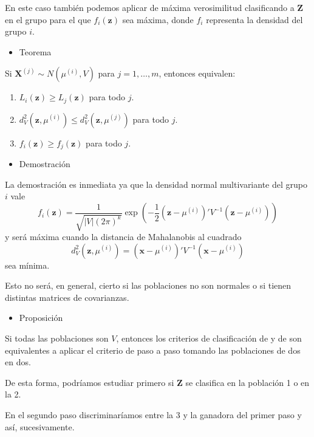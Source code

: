 En este caso también podemos aplicar de máxima verosimilitud clasificando a $\mathbf{Z}$ en el grupo para el que $f_i(\mathbf{z})$ sea máxima, donde $f_i$ representa la densidad del grupo $i$.

\begin{itemize}[label=\color{red}\textbullet, leftmargin=*]
	\item \color{lightblue}Teorema
\end{itemize}
Si $\mathbf{X}^{(j)}\sim N(\mu^{(i)},V)$ para $j=1,\dots,m$, entonces equivalen:
\begin{enumerate}[label=\color{lightblue}\arabic*)]
	\item $L_i(\mathbf{z})\ge L_j(\mathbf{z})$ para todo $j$.
\item $d_V^2(\mathbf{z},\mu^{(i)})\le d_V^2(\mathbf{z},\mu^{(j)})$ para todo $j$.
\item $f_i(\mathbf{z})\ge f_j(\mathbf{z})$ para todo $j$.
\end{enumerate}
\begin{itemize}[label=\color{red}\textbullet, leftmargin=*]
	\item \color{lightblue}Demostración
\end{itemize}
La demostración es inmediata ya que la densidad normal multivariante del grupo $i$ vale \[ f_i(\mathbf{z})=\dfrac{1}{\sqrt{|V|(2\pi)^{k}}}\exp\left(-\dfrac{1}{2}(\mathbf{z}-\mu^{(i)})'V^{-1}(\mathbf{z}-\mu^{(i)})\right) \]y será máxima cuando la distancia de Mahalanobis al cuadrado \[ d_V^2(\mathbf{z},\mu^{(i)})=(\mathbf{x}-\mu^{(i)})'V^{-1}(\mathbf{x}-\mu^{(i)}) \]sea mínima.

Esto no será, en general, cierto si las poblaciones no son normales o si tienen distintas matrices de covarianzas.

\begin{itemize}[label=\color{red}\textbullet, leftmargin=*]
	\item \color{lightblue}Proposición
\end{itemize}
Si todas las poblaciones son  $V$, entonces los criterios de clasificación de  y de  son equivalentes a aplicar el criterio de  paso a paso tomando las poblaciones de dos en dos.

De esta forma, podríamos estudiar primero si \textbf{Z} se clasifica en la población 1 o en la 2.

En el segundo paso discriminaríamos entre la 3 y la ganadora del primer paso y así, sucesivamente.

